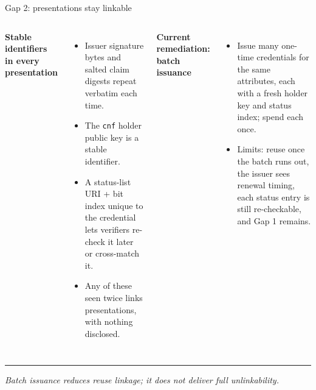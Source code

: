 \documentclass[aspectratio=169]{beamer}
\newcommand{\sourcefoot}{}
\newcommand{\setsources}[1]{\renewcommand{\sourcefoot}{#1}}
\newcommand{\labelhead}[1]{{\small\bfseries\color{zkblue}#1}\par\vspace{0.25em}}
\newcommand{\takeaway}[1]{%
  \vspace{0.45em}%
  {\color{zkrule}\rule{\linewidth}{0.5pt}}\par
  \vspace{0.3em}%
  {\small\itshape\color{zkmuted}#1\par}}
\begin{document}
\setsources{\href{https://swiyu-admin-ch.github.io/threat-model/}{swiyu Threat Model}; \href{https://www.eid.admin.ch/en/so-wird-die-e-id-unverknuepfbar-e}{e-ID batch issuance}; \href{https://raw.githubusercontent.com/swiyu-admin-ch/community/main/tech-concepts/e-id-key-management-batch-issuance-and-renewal.md}{Batch issuance whitepaper}}
\begin{frame}{Gap 2: presentations stay linkable}
  \begin{columns}[T,onlytextwidth]
      \labelhead{Stable identifiers in every presentation}
      \begin{itemize}
        \item Issuer signature bytes and salted claim digests repeat verbatim
          each time.
        \item The \texttt{cnf} holder public key is a stable identifier.
        \item A status-list URI + bit index unique to the credential lets
          verifiers re-check it later or cross-match it.
        \item Any of these seen twice links presentations, with nothing
          disclosed.
      \end{itemize}

      \labelhead{Current remediation: batch issuance}
      \begin{itemize}
        \item Issue many one-time credentials for the same attributes, each with
          a fresh holder key and status index; spend each once.
        \item Limits: reuse once the batch runs out, the issuer sees renewal
          timing, each status entry is still re-checkable, and Gap 1 remains.
      \end{itemize}
  \end{columns}

  \takeaway{Batch issuance reduces reuse linkage; it does not deliver full unlinkability.}
\end{frame}
\end{document}

